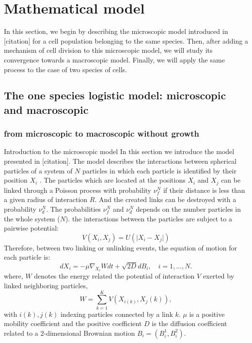 \section{Mathematical model}
In this section, we begin by describing the microscopic model introduced in [citation] for a cell population belonging to the same species. Then, after adding a mechanism of cell division to this microscopic model, we will study its convergence towards a macroscopic model. Finally, we will apply the same process to the case of two species of cells.
	\subsection{The one species logistic model: microscopic and macroscopic}
	\subsubsection{from microscopic to macroscopic without growth}
	\begin{paragraph}{Introduction to the microscopic model}
	In this section we introduce the model presented in [citation]. The model describes the interactions between spherical particles of a system of $N$ particles in which each particle is identified by their position $X_i$ . The  particles which are located at the positions $X_i$ and $X_j$ can be linked through a Poisson process with probability $\nu_{f}^{N}$ if their distance is less than a given radius of interaction $R$. And the created links can be destroyed with a probability $\nu_{d}^{N}$. The probabilities $\nu_{f}^{N}$ and $\nu_{d}^{N}$ depends on the number particles in the whole system ($N$).
	 the interactions between the particles are subject to a pairwise potential:
	 \begin{equation}
	 V(X_i, X_j) = U(\vert X_i - X_j \vert)
	 \end{equation}
Therefore, between two linking or unlinking events, the equation of motion for each particle is: 
	\begin{equation}
	d X_i = -\mu \nabla_{X_i} W dt + \sqrt{2D}d B_i, \quad i = 1, \ldots ,N.
	\end{equation}
where, $W$ denotes the energy related the potential of interaction $V$ exerted by linked neighboring particles,
	$$ W = \sum_{k=1}^{K} V(X_{i(k)}, X_j(k)),$$
with $i(k), j(k)$ indexing particles connected by a link $k$. $\mu$ is a positive mobility coefficient and the positive coefficient $D$ is the diffusion coefficient related to a 2-dimensional Brownian motion $B_i = (B_i^1, B_i^2)$.
	\end{paragraph}

